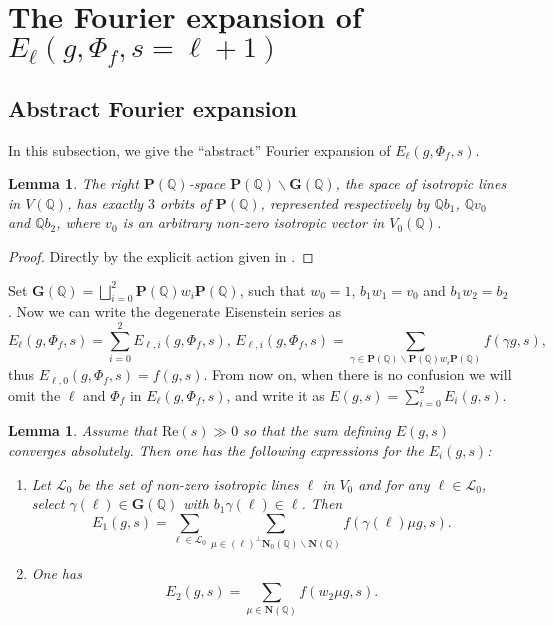 \documentclass[12pt]{article}
\newtheorem{lemma}[thm]{Lemma}
\theoremstyle{remark}
\theoremstyle{definition}
\newcommand{\Q}{\mathbb{Q}}
\newcommand{\rmm}[1]{\mathrm{#1}}
\newcommand{\bff}[1]{\mathbf{#1}}
\newcommand{\call}[1]{\mathcal{#1}}
\begin{document}
\section{The Fourier expansion of \texorpdfstring{$E_{\ell}(g,\Phi_{f},s=\ell+1)$}{PDFstring}}
\label{section Fourier expansion of Eisenstein series}
\subsection{Abstract Fourier expansion}
\label{section abstract Fourier expansion}
In this subsection,
we give the ``abstract'' Fourier expansion of $E_{\ell}(g,\Phi_{f},s)$.
\begin{lemma}\label{lemma double coset of parabolic of unitary groups}
    The right $\bff{P}(\Q)$-space $\bff{P}(\Q)\backslash \bff{G}(\Q)$,
    the space of isotropic lines in $V(\Q)$,
    has exactly $3$ orbits of $\bff{P}(\Q)$,
    represented respectively by $\Q b_{1}$, $\Q v_{0}$ and $\Q b_{2}$,
    where $v_{0}$ is an arbitrary non-zero isotropic vector in $V_{0}(\Q)$.
\end{lemma}
\begin{proof}
    Directly by the explicit action given in .
\end{proof}
Set $\bff{G}(\Q)=\bigsqcup_{i=0}^{2}\bff{P}(\Q)w_{i} \bff{P}(\Q)$,
such that $w_{0}=1$,
$b_{1}w_{1}=v_{0}$ and $b_{1}w_{2}=b_{2}$.
Now we can write the degenerate Eisenstein series as 
\[E_{\ell}(g,\Phi_{f},s)=\sum_{i=0}^{2}E_{\ell,i}(g,\Phi_{f},s),\,E_{\ell,i}(g,\Phi_{f},s)=\sum_{\gamma\in \bff{P}(\Q)\backslash \bff{P}(\Q)w_{i}\bff{P}(\Q)}f(\gamma g,s),\]
thus $E_{\ell,0}(g,\Phi_{f},s)=f(g,s)$.
From now on,
when there is no confusion
we will omit the $\ell$ and $\Phi_{f}$ in $E_{\ell}(g,\Phi_{f},s)$,
and write it as $E(g,s)=\sum_{i=0}^{2}E_{i}(g,s)$.

\begin{lemma}
    \label{lemma rank decomposition of Eisenstein series}
    Assume that $\rmm{Re}(s)\gg 0$ so that the sum defining $E(g,s)$ converges absolutely.
    Then one has the following expressions for the $E_{i}(g,s)$:
    \begin{enumerate}
        \item Let $\call{L}_{0}$ be the set of non-zero isotropic lines $\ell$ in $V_{0}$ 
        and for any $\ell\in\call{L}_{0}$, select $\gamma(\ell)\in \bff{G}(\Q)$ with $b_{1}\gamma(\ell)\in\ell$.
        Then \[E_{1}(g,s)=\sum_{\ell\in\call{L}_{0}}\sum_{\mu\in(\ell)^{\perp}\bff{N}_{0}(\Q)\backslash\bff{N}(\Q)}f(\gamma(\ell)\mu g,s).\] 
        \item One has 
        \[E_{2}(g,s)=\sum_{\mu\in \bff{N}(\Q)}f(w_{2}\mu g,s).\]
    \end{enumerate}
\end{lemma} 
\end{document}
